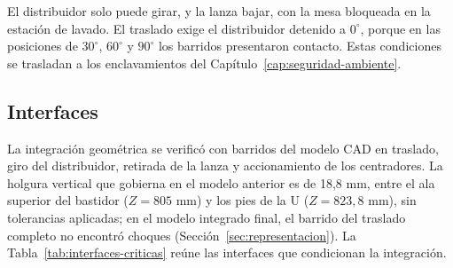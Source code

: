 El distribuidor solo puede girar, y la lanza bajar, con la mesa bloqueada en la estación de lavado. El traslado exige el distribuidor detenido a $0^\circ$, porque en las posiciones de $30^\circ$, $60^\circ$ y $90^\circ$ los barridos presentaron contacto. Estas condiciones se trasladan a los enclavamientos del Capítulo~\ref{cap:seguridad-ambiente}.

\subsection*{Interfaces}

La integración geométrica se verificó con barridos del modelo CAD en traslado, giro del distribuidor, retirada de la lanza y accionamiento de los centradores. La holgura vertical que gobierna en el modelo anterior es de 18,8 mm, entre el ala superior del bastidor ($Z=805$ mm) y los pies de la U ($Z=823{,}8$ mm), sin tolerancias aplicadas; en el modelo integrado final, el barrido del traslado completo no encontró choques (Sección~\ref{sec:representacion}). La Tabla~\ref{tab:interfaces-criticas} reúne las interfaces que condicionan la integración.

